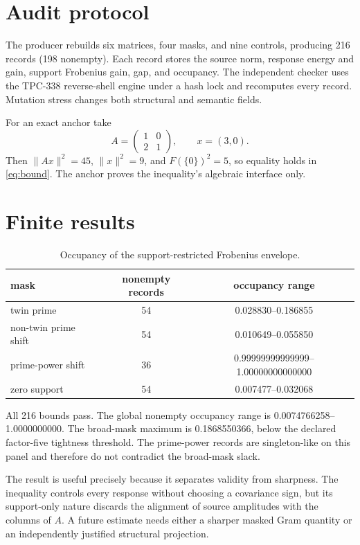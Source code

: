 \documentclass[10pt]{article}
\begin{document}
\section{Audit protocol}

The producer rebuilds six matrices, four masks, and nine controls, producing
216 records (198 nonempty).  Each record stores the source norm, response
energy and gain, support Frobenius gain, gap, and occupancy.  The independent
checker uses the TPC-338 reverse-shell engine under a hash lock and recomputes
every record.  Mutation stress changes both structural and semantic fields.

For an exact anchor take
\[
 A=\begin{pmatrix}1&0\\2&1\end{pmatrix},\qquad x=(3,0).
\]
Then $\|Ax\|^2=45$, $\|x\|^2=9$, and $F(\{0\})^2=5$, so equality holds in
\eqref{eq:bound}.  The anchor proves the inequality's algebraic interface only.

\section{Finite results}

\begin{table}[ht]
\centering\small
\caption{Occupancy of the support-restricted Frobenius envelope.}
\label{tab:occupancy}
\begin{tabular}{lcc}
\toprule
mask & nonempty records & occupancy range\\
\midrule
twin prime & 54 & 0.028830--0.186855\\
non-twin prime shift & 54 & 0.010649--0.055850\\
prime-power shift & 36 & 0.99999999999999--1.00000000000000\\
zero support & 54 & 0.007477--0.032068\\
\bottomrule
\end{tabular}
\end{table}

All 216 bounds pass.  The global nonempty occupancy range is
0.0074766258--1.0000000000.  The broad-mask maximum is 0.1868550366, below
the declared factor-five tightness threshold.  The prime-power records are
singleton-like on this panel and therefore do not contradict the broad-mask
slack.

The result is useful precisely because it separates validity from sharpness.
The inequality controls every response without choosing a covariance sign, but
its support-only nature discards the alignment of source amplitudes with the
columns of $A$.  A future estimate needs either a sharper masked Gram quantity
or an independently justified structural projection.
\end{document}
